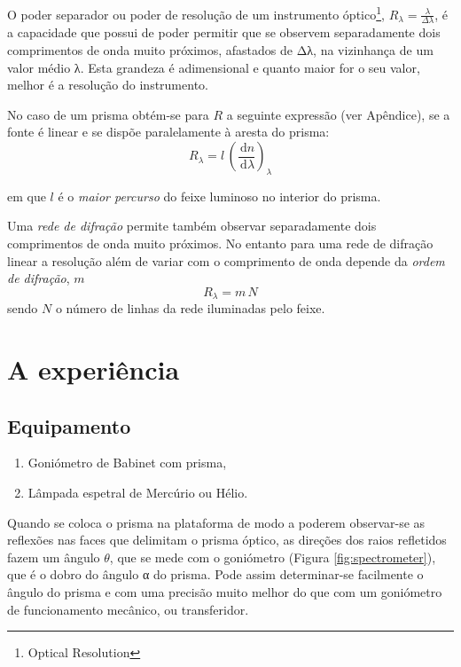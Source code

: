 \documentclass[a4paper,12pt]{article}  %
\newcommand{\ud}{\,\mathrm{d}}
\begin{document}
O poder separador ou poder de resolução de um instrumento óptico\footnote{Optical Resolution}, $R_\lambda = \frac{\lambda}{\Delta \lambda} $,  é a capacidade que possui de poder permitir que se observem separadamente dois comprimentos de onda muito próximos, afastados de Δλ, na vizinhança de um valor médio λ. Esta grandeza é adimensional e quanto maior for o seu valor, melhor é a resolução do instrumento.

No caso de um prisma obtém-se para $R$ a seguinte expressão (ver Apêndice), se a fonte é linear e se dispõe paralelamente à aresta do prisma:
 \begin{equation}
	\label{eq:resolu}
	R_\lambda = l\,\left(\frac{\ud n}{\ud \lambda} \right)_\lambda 
\end{equation}

em que $l$ é o \emph{maior percurso} do feixe luminoso no interior do prisma.

Uma \emph{rede de difração}
permite também observar separadamente dois comprimentos de onda muito próximos.
No entanto para uma rede de difração linear a resolução além de variar com o comprimento de onda depende da \emph{ordem de difração}, $m$
 \begin{equation}
	\label{eq:resoludrifa}
	R_\lambda = m\,N 
\end{equation}
sendo $N$  o número de linhas da rede iluminadas pelo feixe.


\section{\sf A experiência}
\subsection{\sf Equipamento}

\begin{enumerate}
\item Goniómetro de Babinet com prisma,
\item Lâmpada espetral de Mercúrio ou Hélio.
\end{enumerate}

Quando se coloca o prisma na plataforma de modo a poderem observar-se as reflexões nas faces que delimitam o prisma óptico, as direções dos raios refletidos fazem um ângulo $\theta$, que se mede com o goniómetro (Figura \ref{fig:spectrometer}), que é o dobro do ângulo α do prisma. Pode assim determinar-se facilmente o ângulo do prisma e com uma precisão muito melhor do que com um goniómetro de funcionamento mecânico, ou transferidor.
\end{document}
